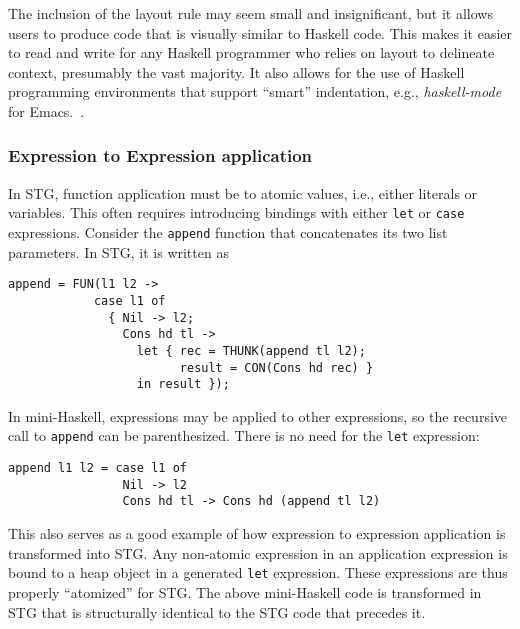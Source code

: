 \documentclass{llncs}
\begin{document}
The inclusion of the layout rule may seem small and insignificant, but it
allows users to produce code that is visually similar to Haskell code.
This makes it easier to read and write for any Haskell programmer who relies
on layout to delineate context, presumably the vast majority.  It also allows
for the use of Haskell programming environments that support ``smart''
indentation, e.g., \emph{haskell-mode} for Emacs.~\cite{haskellmode}.





\subsubsection{Expression to Expression application}

In STG, function application must be to atomic values, i.e., either literals or
variables.  This often requires introducing bindings with either \texttt{let} or
\texttt{case} expressions.  Consider the \texttt{append} function that
concatenates its two list parameters.  In STG, it is written as

\begin{verbatim}
append = FUN(l1 l2 ->
            case l1 of
              { Nil -> l2;
                Cons hd tl -> 
                  let { rec = THUNK(append tl l2);
                        result = CON(Cons hd rec) }
                  in result });
\end{verbatim}

In mini-Haskell, expressions may be applied to other expressions, so the
recursive call to \texttt{append} can be parenthesized. There is no need for the
\texttt{let} expression:

\begin{verbatim}
append l1 l2 = case l1 of
                Nil -> l2
                Cons hd tl -> Cons hd (append tl l2)
\end{verbatim}

This also serves as a good example of how expression to expression application is
transformed into STG.  Any non-atomic expression in an application expression is
bound to a heap object in a generated \texttt{let} expression.  These
expressions are thus properly ``atomized'' for STG.  The above mini-Haskell code
is transformed in STG that is structurally identical to the STG code that
precedes it.
\end{document}
